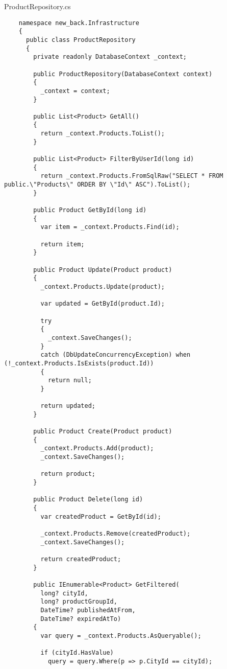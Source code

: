 ProductRepository.cs
\lstset{style=sharpc}
\begin{lstlisting}
    namespace new_back.Infrastructure
    {
      public class ProductRepository
      {
        private readonly DatabaseContext _context;
    
        public ProductRepository(DatabaseContext context)
        {
          _context = context;
        }
    
        public List<Product> GetAll()
        {
          return _context.Products.ToList();
        }
    
        public List<Product> FilterByUserId(long id)
        {
          return _context.Products.FromSqlRaw("SELECT * FROM public.\"Products\" ORDER BY \"Id\" ASC").ToList();
        }
    
        public Product GetById(long id)
        {
          var item = _context.Products.Find(id);
    
          return item;
        }
    
        public Product Update(Product product)
        {
          _context.Products.Update(product);
    
          var updated = GetById(product.Id);
    
          try
          {
            _context.SaveChanges();
          }
          catch (DbUpdateConcurrencyException) when (!_context.Products.IsExists(product.Id))
          {
            return null;
          }
    
          return updated;
        }
    
        public Product Create(Product product)
        {
          _context.Products.Add(product);
          _context.SaveChanges();
    
          return product;
        }
    
        public Product Delete(long id)
        {
          var createdProduct = GetById(id);
    
          _context.Products.Remove(createdProduct);
          _context.SaveChanges();
    
          return createdProduct;
        }
    
        public IEnumerable<Product> GetFiltered(
          long? cityId, 
          long? productGroupId, 
          DateTime? publishedAtFrom, 
          DateTime? expiredAtTo)
        {
          var query = _context.Products.AsQueryable();
    
          if (cityId.HasValue)
            query = query.Where(p => p.CityId == cityId);
    

\end{lstlisting}
